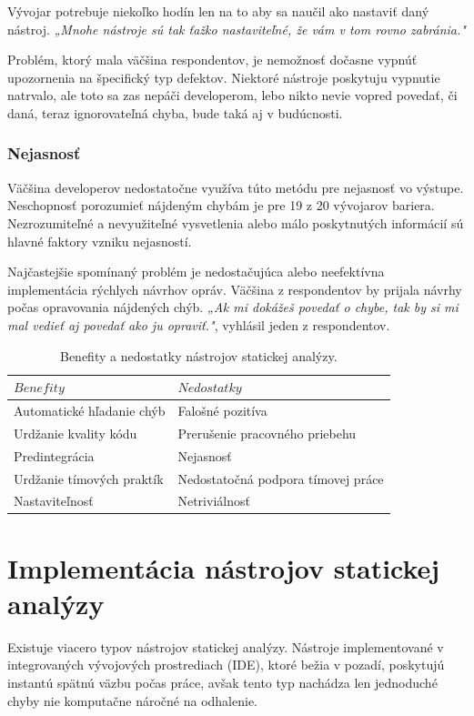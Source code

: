 \documentclass[10pt,twoside,slovak,a4paper]{article}
\begin{document}
Vývojar potrebuje niekoľko hodín len na to aby sa naučil ako nastaviť daný nástroj. \emph{„Mnohe nástroje sú tak ťažko nastaviteľné, že vám v tom rovno zabránia."}

Problém, ktorý mala väčšina respondentov, je nemožnosť dočasne vypnúť upozornenia na špecifický typ defektov. Niektoré
nástroje poskytuju vypnutie natrvalo, ale toto sa zas nepáči developerom, lebo nikto nevie vopred povedať, či daná,
teraz ignorovateľná chyba, bude taká aj v budúcnosti.

\subsubsection*{Nejasnosť}
Väčšina developerov nedostatočne využíva túto metódu pre nejasnosť vo výstupe. Neschopnosť porozumieť nájdeným chybám
je pre 19 z 20 vývojarov bariera. Nezrozumiteľné a nevyužiteľné vysvetlenia alebo málo poskytnutých informácií sú hlavné
faktory vzniku nejasností.

Najčastejšie spomínaný problém je nedostačujúca alebo neefektívna implementácia rýchlych návrhov opráv. Väčšina z
respondentov by prijala návrhy počas opravovania nájdených chýb. \emph{„Ak mi dokážeš povedať o chybe, tak by si mi mal
	vedieť aj povedať ako ju opraviť."}, vyhlásil jeden z respondentov.

\begin{table}
	\begin{center}
		\begin{tabular}{l|l}
			$Benefity$                & $Nedostatky$                       \\
			\hline
			Automatické hľadanie chýb & Falošné pozitíva                   \\
			Urdžanie kvality kódu     & Prerušenie pracovného priebehu     \\
			Predintegrácia            & Nejasnosť                          \\
			Urdžanie tímových praktík & Nedostatočná podpora tímovej práce \\
			Nastaviteľnosť            & Netriviálnosť                      \\
		\end{tabular}
		\caption{Benefity a nedostatky nástrojov statickej analýzy.}
	\end{center}
\end{table}

\section{Implementácia nástrojov statickej analýzy} \label{implementacia}
Existuje viacero typov nástrojov statickej analýzy. Nástroje implementované v integrovaných vývojových prostrediach (IDE),
ktoré bežia v pozadí, poskytujú instantú spätnú väzbu počas práce, avšak tento typ nachádza len jednoduché chyby nie
komputačne náročné na odhalenie.
\end{document}

